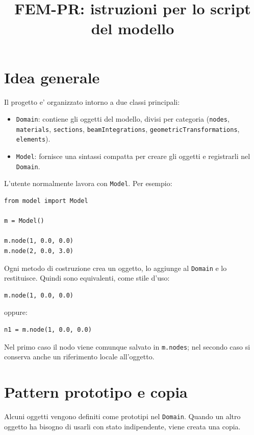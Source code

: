 \documentclass[11pt,a4paper]{article}
\title{FEM-PR: istruzioni per lo script del modello}
\author{}
\date{}
\begin{document}
\maketitle

\section{Idea generale}

Il progetto e' organizzato intorno a due classi principali:

\begin{itemize}
    \item \texttt{Domain}: contiene gli oggetti del modello, divisi per categoria
    (\texttt{nodes}, \texttt{materials}, \texttt{sections}, \texttt{beamIntegrations},
    \texttt{geometricTransformations}, \texttt{elements}).
    \item \texttt{Model}: fornisce una sintassi compatta per creare gli oggetti e
    registrarli nel \texttt{Domain}.
\end{itemize}

L'utente normalmente lavora con \texttt{Model}. Per esempio:

\begin{lstlisting}[style=pythonstyle]
from model import Model

m = Model()

m.node(1, 0.0, 0.0)
m.node(2, 0.0, 3.0)
\end{lstlisting}

Ogni metodo di costruzione crea un oggetto, lo aggiunge al \texttt{Domain} e lo
restituisce. Quindi sono equivalenti, come stile d'uso:

\begin{lstlisting}[style=pythonstyle]
m.node(1, 0.0, 0.0)
\end{lstlisting}

oppure:

\begin{lstlisting}[style=pythonstyle]
n1 = m.node(1, 0.0, 0.0)
\end{lstlisting}

Nel primo caso il nodo viene comunque salvato in \texttt{m.nodes}; nel secondo
caso si conserva anche un riferimento locale all'oggetto.

\section{Pattern prototipo e copia}

Alcuni oggetti vengono definiti come prototipi nel \texttt{Domain}. Quando un
altro oggetto ha bisogno di usarli con stato indipendente, viene creata una copia.
\end{document}
